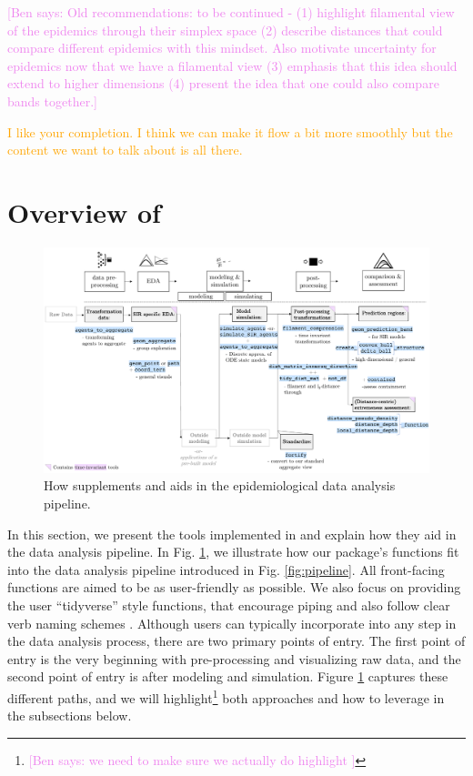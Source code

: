 \documentclass[
  shortnames]{jss}
\begin{document}
\textcolor{violet}{[Ben says: Old recommendations:
to be continued - (1) highlight filamental view of the epidemics through their simplex space (2) describe distances that could compare different epidemics with this mindset. Also motivate uncertainty for epidemics now that we have a filamental view (3) emphasis that this idea should extend to higher dimensions (4) present the idea that one could also compare bands together.]}

\textcolor{orange}{I like your completion.  I think we can make it flow a bit more smoothly but the content we want to talk about is all there.}

\section[Package overview]{Overview of
}\label{sec:overview}

\afterpage{\clearpage}
\begin{figure}
    \centering
    \includegraphics[width = 1\textwidth]{images/pipeline2_1.pdf}
    \caption{How  supplements and aids in the epidemiological data analysis pipeline.}
    \label{fig:pipeline2}
\end{figure}

In this section, we present the tools implemented in 
and explain how they aid in the data analysis pipeline. In Fig.
\ref{fig:pipeline2}, we illustrate how our package's functions fit into
the data analysis pipeline introduced in Fig. \ref{fig:pipeline}. All
front-facing functions are aimed to be as user-friendly as possible. We
also focus on providing the user ``tidyverse'' style functions, that
encourage piping and also follow clear verb naming schemes
\citep{Wickham2019}. Although users can typically incorporate
 into any step in the data analysis process, there are
two primary points of entry. The first point of entry is the very
beginning with pre-processing and visualizing raw data, and the second
point of entry is after modeling and simulation. Figure
\ref{fig:pipeline2} captures these different paths, and we will
highlight\footnote{\textcolor{violet}{[Ben says: we need to make sure we actually do highlight ]}}
both approaches and how to leverage  in the subsections
below.
\end{document}

